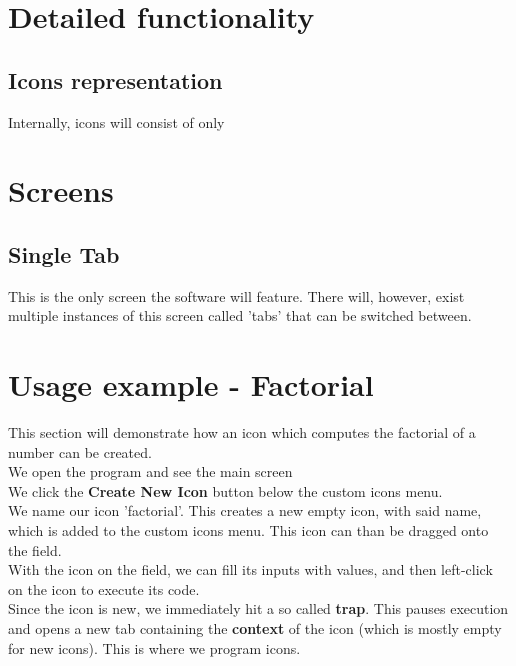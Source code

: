 \documentclass{article}
\begin{document}
    \section{Detailed functionality}
        \subsection{Icons representation}
            Internally, icons will consist of only 



    \section{Screens}
        \subsection{Single Tab}
        This is the only screen the software will feature. There will, however, exist multiple instances of this screen
        called 'tabs' that can be switched between.


    \section{Usage example - Factorial}
        This section will demonstrate how an icon which computes the factorial of a number can be created.\\

        We open the program and see the main screen\\

        We click the \textbf{Create New Icon} button below the custom icons menu.\\

        We name our icon 'factorial'. This creates a new empty icon, with said name, which is added to the custom icons
        menu. This icon can than be dragged onto the field. \\

        With the icon on the field, we can fill its inputs with values, and then left-click on the icon to execute its
        code. \\

        Since the icon is new, we immediately hit a so called \textbf{trap}. This pauses execution and opens a new tab
        containing the \textbf{context} of the icon (which is mostly empty for new icons). This is where we program
        icons. \\
\end{document}
